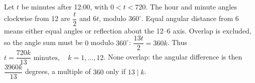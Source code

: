 Let $t$ be minutes after 12:00, with $0<t<720$. The hour and minute angles clockwise from 12 are $\dfrac{t}{2}$ and $6t$, modulo $360^\circ$. Equal angular distance from 6 means either equal angles or reflection about the 12--6 axis. Overlap is excluded, so the angle sum must be $0$ modulo $360^\circ$: $\dfrac{13t}{2}=360k$. Thus $\boxed{t=\dfrac{720k}{13}\text{ minutes},\quad k=1,\ldots,12}$. None overlap: the angular difference is then $\dfrac{3960k}{13}$ degrees, a multiple of $360$ only if $13\mid k$.
